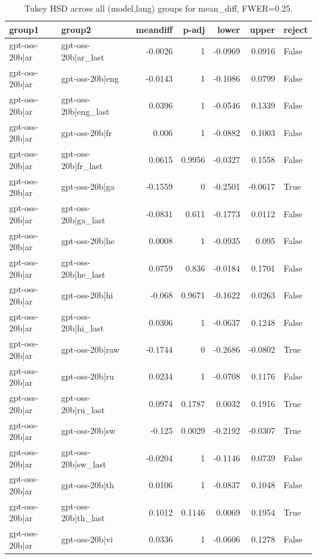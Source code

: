 \begin{table}
\caption{Tukey HSD across all (model,lang) groups for mean_diff, FWER=0.25.}
\label{tab:tukey_all_models_all_langs_mean_diff}
\begin{tabular}{l l r r r r l}
\toprule
group1 & group2 & meandiff & p-adj & lower & upper & reject \\
\midrule
gpt-oss-20b|ar & gpt-oss-20b|ar_last & -0.0026 & 1 & -0.0969 & 0.0916 & False \\
gpt-oss-20b|ar & gpt-oss-20b|eng & -0.0143 & 1 & -0.1086 & 0.0799 & False \\
gpt-oss-20b|ar & gpt-oss-20b|eng_last & 0.0396 & 1 & -0.0546 & 0.1339 & False \\
gpt-oss-20b|ar & gpt-oss-20b|fr & 0.006 & 1 & -0.0882 & 0.1003 & False \\
gpt-oss-20b|ar & gpt-oss-20b|fr_last & 0.0615 & 0.9956 & -0.0327 & 0.1558 & False \\
gpt-oss-20b|ar & gpt-oss-20b|ga & -0.1559 & 0 & -0.2501 & -0.0617 & True \\
gpt-oss-20b|ar & gpt-oss-20b|ga_last & -0.0831 & 0.611 & -0.1773 & 0.0112 & False \\
gpt-oss-20b|ar & gpt-oss-20b|he & 0.0008 & 1 & -0.0935 & 0.095 & False \\
gpt-oss-20b|ar & gpt-oss-20b|he_last & 0.0759 & 0.836 & -0.0184 & 0.1701 & False \\
gpt-oss-20b|ar & gpt-oss-20b|hi & -0.068 & 0.9671 & -0.1622 & 0.0263 & False \\
gpt-oss-20b|ar & gpt-oss-20b|hi_last & 0.0306 & 1 & -0.0637 & 0.1248 & False \\
gpt-oss-20b|ar & gpt-oss-20b|raw & -0.1744 & 0 & -0.2686 & -0.0802 & True \\
gpt-oss-20b|ar & gpt-oss-20b|ru & 0.0234 & 1 & -0.0708 & 0.1176 & False \\
gpt-oss-20b|ar & gpt-oss-20b|ru_last & 0.0974 & 0.1787 & 0.0032 & 0.1916 & True \\
gpt-oss-20b|ar & gpt-oss-20b|sw & -0.125 & 0.0029 & -0.2192 & -0.0307 & True \\
gpt-oss-20b|ar & gpt-oss-20b|sw_last & -0.0204 & 1 & -0.1146 & 0.0739 & False \\
gpt-oss-20b|ar & gpt-oss-20b|th & 0.0106 & 1 & -0.0837 & 0.1048 & False \\
gpt-oss-20b|ar & gpt-oss-20b|th_last & 0.1012 & 0.1146 & 0.0069 & 0.1954 & True \\
gpt-oss-20b|ar & gpt-oss-20b|vi & 0.0336 & 1 & -0.0606 & 0.1278 & False \\

\end{tabular}
\end{table}
